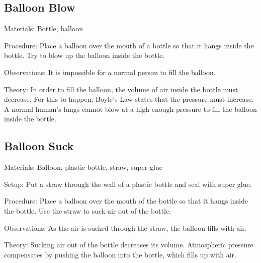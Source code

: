 \begin{multicols}{2}
\subsection{Balloon Blow}


\begin{description*}
\item[Materials:]{Bottle, balloon}
\item[Procedure:]{Place a balloon over the mouth of a bottle so that it hangs inside the bottle. Try to blow up the balloon inside the bottle.}
\item[Observations:]{It is impossible for a normal person to fill the balloon.}
\item[Theory:]{In order to fill the balloon, the volume of air inside the bottle must decrease. For this to happen, Boyle's Law states that the pressure must increase. A normal human's lungs cannot blow at a high enough pressure to fill the balloon inside the bottle.}
\end{description*}

\subsection{Balloon Suck}


\begin{description*}
\item[Materials:]{Balloon, plastic bottle, straw, super glue}
\item[Setup:]{Put a straw through the wall of a plastic bottle and seal with super glue.}
\item[Procedure:]{Place a balloon over the mouth of the bottle so that it hangs inside the bottle. Use the straw to suck air out of the bottle.}
\item[Observations:]{As the air is sucked through the straw, the balloon fills with air.}
\item[Theory:]{Sucking air out of the bottle decreases its volume. Atmospheric pressure compensates by pushing the balloon into the bottle, which fills up with air.}
\end{description*}



\end{multicols}

\pagebreak